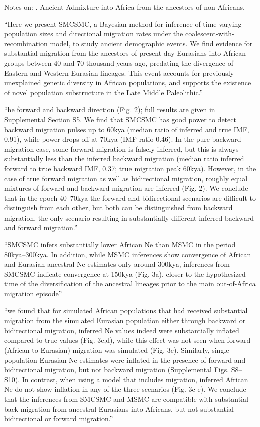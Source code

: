 \documentclass{article}
\begin{document}
Notes on: \citet{Cole:bioRxiv-2020.06.01.127555}. Ancient Admixture
into Africa from the ancestors of non-Africans.

``Here we present SMCSMC, a Bayesian method for inference of
time-varying population sizes and directional migration rates
under the coalescent-with-recombination model, to study ancient
demographic events. We find evidence for substantial migration
from the ancestors of present-day Eurasians into African groups
between 40 and 70 thousand years ago, predating the divergence of
Eastern and Western Eurasian lineages. This event accounts for
previously unexplained genetic diversity in African populations,
and supports the existence of novel population substructure in the
Late Middle Paleolithic.''

``he forward and backward direction (Fig. 2); full results are given
in Supplemental Section S5. We find that SMCSMC has good power to
detect backward migration pulses up to 60kya (median ratio of inferred
and true IMF, 0.91), while power drops off at 70kya (IMF ratio
0.46). In the pure backward migration case, some forward migration is
falsely inferred, but this is always substantially less than the
inferred backward migration (median ratio inferred forward to true
backward IMF, 0.37; true migration peak 60kya). However, in the case
of true forward migration as well as bidirectional migration, roughly
equal mixtures of forward and backward migration are inferred
(Fig. 2). We conclude that in the epoch 40–70kya the forward and
bidirectional scenarios are difficult to distinguish from each other,
but both can be distinguished from backward migration, the only
scenario resulting in substantially different inferred backward and
forward migration.''

``SMCSMC infers substantially lower African Ne than MSMC in the period
80kya–300kya. In addition, while MSMC inferences show convergence of
African and Eurasian ancestral Ne estimates only around 300kya,
inferences from SMCSMC indicate convergence at 150kya (Fig. 3a),
closer to the hypothesized time of the diversification of the
ancestral lineages prior to the main out-of-Africa migration episode''

``we found that for simulated African populations that had received
substantial migration from the simulated Eurasian population either
through backward or bidirectional migration, inferred Ne values indeed
were substantially inflated compared to true values (Fig. 3c,d), while
this effect was not seen when forward (African-to-Eurasian) migration
was simulated (Fig. 3e). Similarly, single-population Eurasian Ne
estimates were inflated in the presence of forward and bidirectional
migration, but not backward migration (Supplemental Figs. S8–S10). In
contrast, when using a model that includes migration, inferred African
Ne do not show inflation in any of the three scenarios (Fig. 3c-e). We
conclude that the inferences from SMCSMC and MSMC are compatible with
substantial back-migration from ancestral Eurasians into Africans, but
not substantial bidirectional or forward migration.''
\end{document}
